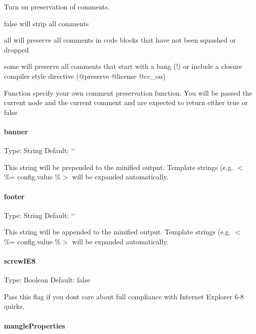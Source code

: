 Turn on preservation of comments.


\begin{DoxyItemize}
\item {\ttfamily false} will strip all comments
\item {\ttfamily \textquotesingle{}all\textquotesingle{}} will preserve all comments in code blocks that have not been squashed or dropped
\item {\ttfamily \textquotesingle{}some\textquotesingle{}} will preserve all comments that start with a bang ({\ttfamily !}) or include a closure compiler style directive ({\ttfamily @preserve} {\ttfamily @license} {\ttfamily @cc\+\_\+on})
\item {\ttfamily Function} specify your own comment preservation function. You will be passed the current node and the current comment and are expected to return either {\ttfamily true} or {\ttfamily false}
\end{DoxyItemize}

\paragraph*{banner}

Type\+: {\ttfamily String} Default\+: `\textquotesingle{}\textquotesingle{}`

This string will be prepended to the minified output. Template strings (e.\+g. {\ttfamily $<$\%= config.\+value \%$>$} will be expanded automatically.

\paragraph*{footer}

Type\+: {\ttfamily String} Default\+: `\textquotesingle{}\textquotesingle{}`

This string will be appended to the minified output. Template strings (e.\+g. {\ttfamily $<$\%= config.\+value \%$>$} will be expanded automatically.

\paragraph*{screw\+I\+E8}

Type\+: {\ttfamily Boolean} Default\+: {\ttfamily false}

Pass this flag if you don\textquotesingle{}t care about full compliance with Internet Explorer 6-\/8 quirks.

\paragraph*{mangle\+Properties}

